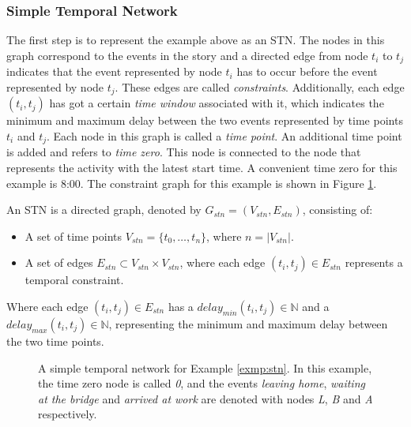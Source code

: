 \documentclass{article}
\theoremstyle{definition}
\newcommand{\mindelay}[2]{\ensuremath{delay_{min}(t_{#1}, t_{#2})}} %
\newcommand{\maxdelay}[2]{\ensuremath{delay_{max}(t_{#1}, t_{#2})}} %
\newenvironment{definition}[1][Definition]{\begin{trivlist}
\item[\hskip \labelsep {\bfseries #1}]}{\end{trivlist}}
\begin{document}
\subsubsection{Simple Temporal Network}
\label{text:stn_subsec}
The first step is to represent the example above as an STN. 
The nodes in this graph correspond to the events in the story and a directed edge from node $t_i$ to $t_j$ indicates that the event represented by node $t_i$ has to occur before the event represented by node $t_j$.
These edges are called \emph{constraints}.
Additionally, each edge $(t_i, t_j)$ has got a certain \emph{time window} associated with it, which indicates the minimum and maximum delay between the two events represented by time points $t_i$ and $t_j$. 
Each node in this graph is called a \emph{time point}. 
An additional time point is added and refers to \emph{time zero}.
This node is connected to the node that represents the activity with the latest start time.
A convenient time zero for this example is 8:00.
The constraint graph for this example is shown in Figure \ref{fig:stn_example}.

\begin{definition}
\label{text:stn_definition}
An STN is a directed graph, denoted by $G_{stn} = (V_{stn}, E_{stn})$, consisting of:
\begin{itemize}
\item A set of time points $V_{stn} = \{t_0, \ldots, t_n\}$, where $n = |V_{stn}|$.
\item A set of edges $E_{stn} \subset V_{stn} \times V_{stn}$, where each edge $(t_i, t_j) \in E_{stn}$ represents a temporal constraint. 
\end{itemize}
Where each edge $(t_i, t_j) \in E_{stn}$ has a $\mindelay{i}{j} \in \mathbb{N}$ and a $\maxdelay{i}{j} \in \mathbb{N}$, representing the minimum and maximum delay between the two time points.
\end{definition}

\begin{figure}[h]
	\centering
	\caption{A simple temporal network for Example \ref{exmp:stn}. In this example, the time zero node is called \emph{0}, and the events \emph{leaving home},  \emph{waiting at the bridge} and \emph{arrived at work} are denoted with nodes \emph{L}, \emph{B} and \emph{A} respectively.}
	\label{fig:stn_example}
\end{figure}
\end{document}
